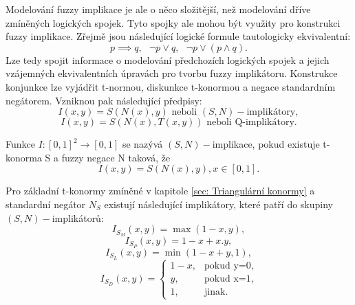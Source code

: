 Modelov\'an\'i fuzzy implikace je ale o něco složitější, než modelov\'an\'i dříve zmíněných logických spojek. Tyto spojky ale mohou být využity pro konstrukci fuzzy implikace. Zřejmě jsou následující logické formule tautologicky ekvivalentní: $$ p\implies q, \mbox{   } \neg p \vee q, \mbox{   } \neg p\vee (p\wedge q) .$$ Lze tedy spojit informace o modelov\'an\'i p\v redchozích logických spojek a jejich vzájemných ekvivalentních \' upravách pro tvorbu fuzzy implikátoru. Konstrukce konjunkce lze vyjádřit t-normou, diskunkce t-konormou a negace standardn\'im negátorem. Vzniknou pak n\'asleduj\'ic\'i p\v redpisy:
$$I(x,y)=S(N(x),y)\text{ neboli $(S,N)-$implikátory},$$
$$I(x,y)=S(N(x),T(x,y)) \text{ neboli Q-implikátory}.$$

\begin{definition}
    \cite{Springer}
    Funkce $I: [0,1]^2 \rightarrow [0,1]$ se nazývá $(S,N)-$implikace, pokud existuje t-konorma S a fuzzy negace N taková, že $$I(x,y) = S(N(x),y), x \in [0,1].$$
\end{definition}

\begin{example}
\cite{Springer}
Pro základní t-konormy zmíněné v kapitole \ref{sec: Triangulární konormy} a standardní negátor $N_S$ existují následující implikátory, které patří do skupiny $(S,N)-$implikátor\r u:\\
    \vbox{$$ I_{S_M}(x,y)=\max(1-x,y),$$ }
\vbox{$$ I_{S_P}(x,y)=1-x+x.y,$$}
 \vbox{$$ I_{S_L}(x,y)=\min(1-x+y,1),$$}
 $$ I_{S_D}(x,y)=\begin{cases} 1-x,
&\mbox {pokud y=0,} \\y, &\mbox {pokud x=1}, \\
1, &\mbox {jinak.} \end{cases} $$
\end{example}

